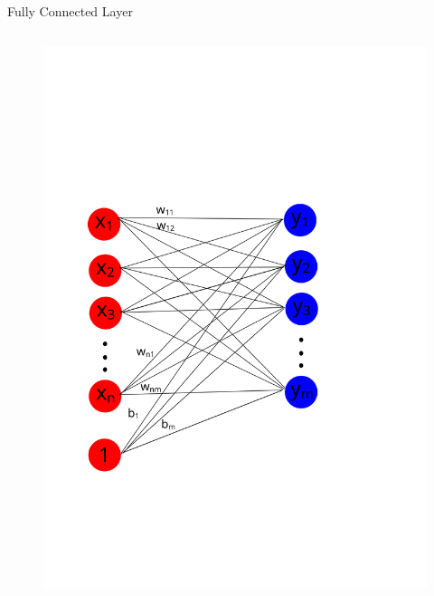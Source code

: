 \documentclass{beamer}
\begin{document}
\begin{frame}{Fully Connected Layer}
\begin{columns}
                \begin{figure}
                    \includegraphics[width=\columnwidth]{fc}
                \end{figure}
        \end{columns}
\end{frame}
\end{document}
